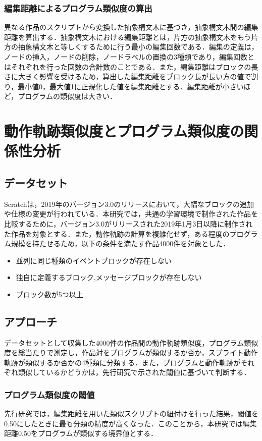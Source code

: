 \documentclass[T,J]{fose} %
\begin{document}
\subsubsection{編集距離によるプログラム類似度の算出}
異なる作品のスクリプトから変換した抽象構文木に基づき，抽象構文木間の編集距離を算出する．抽象構文木における編集距離とは，片方の抽象構文木をもう片方の抽象構文木と等しくするために行う最小の編集回数である．編集の定義は，ノードの挿入，ノードの削除，ノードラベルの置換の3種類であり，編集回数とはそれぞれを行った回数の合計数のことである．また，編集距離はブロックの長さに大きく影響を受けるため，算出した編集距離をブロック長が長い方の値で割り，最小値0，最大値1に正規化した値を編集距離とする．編集距離が小さいほど，プログラムの類似度は大きい．

\section{動作軌跡類似度とプログラム類似度の関係性分析}\label{sec:Analyze related work}

\subsection{データセット}
Scratchは，2019年のバージョン3.0のリリースにおいて，大幅なブロックの追加や仕様の変更が行われている．本研究では，共通の学習環境で制作された作品を比較するために，バージョン3.0がリリースされた2019年1月3日以降に制作された作品を対象とする．また，動作軌跡の計算を複雑化せず，ある程度のプログラム規模を持たせるため，以下の条件を満たす作品4000件を対象とした．
\begin{itemize}
    \item 並列に同じ種類のイベントブロックが存在しない
    \item 独自に定義するブロック,メッセージブロックが存在しない
    \item ブロック数が5つ以上
\end{itemize}
\subsection{アプローチ}\label{subsec:approach}
データセットとして収集した4000件の作品間の動作軌跡類似度，プログラム類似度を総当たりで測定し，作品対をプログラムが類似するか否か，スプライト動作軌跡が類似するか否かの4種類に分類する．また，プログラムと動作軌跡がそれぞれ類似しているかどうかは，先行研究で示された閾値に基づいて判断する．
\subsubsection{プログラム類似度の閾値}
先行研究では，編集距離を用いた類似スクリプトの紐付けを行った結果，閾値を0.50にしたときに最も分類の精度が高くなった．このことから，本研究では編集距離0.50をプログラムが類似する境界値とする．
\end{document}
